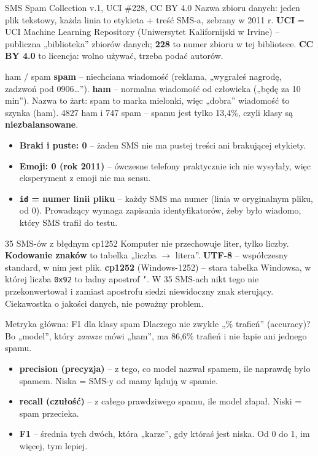 \documentclass[11pt,a4paper]{article}
\begin{document}
\begin{pojecie}{SMS Spam Collection v.1, UCI \#228, CC BY 4.0}
Nazwa zbioru danych: jeden plik tekstowy, każda linia to etykieta + treść SMS-a, zebrany w 2011 r.
\textbf{UCI} = UCI Machine Learning Repository (Uniwersytet Kalifornijski w Irvine) -- publiczna „biblioteka” zbiorów
danych; \textbf{228} to numer zbioru w tej bibliotece. \textbf{CC BY 4.0} to licencja: wolno używać, trzeba podać autorów.
\end{pojecie}

\begin{pojecie}{ham / spam}
\textbf{spam} -- niechciana wiadomość (reklama, „wygrałeś nagrodę, zadzwoń pod 0906…”).
\textbf{ham} -- normalna wiadomość od człowieka („będę za 10 min”). Nazwa to żart: spam to marka mielonki,
więc „dobra” wiadomość to szynka (ham). 4827 ham i 747 spam -- spamu jest tylko 13,4\%, czyli klasy są
\textbf{niezbalansowane}.
\end{pojecie}

\begin{itemize}
  \item \textbf{Braki i puste: 0} -- żaden SMS nie ma pustej treści ani brakującej etykiety.
  \item \textbf{Emoji: 0 (rok 2011)} -- ówczesne telefony praktycznie ich nie wysyłały, więc eksperyment z emoji nie ma sensu.
  \item \textbf{\texttt{id} = numer linii pliku} -- każdy SMS ma numer (linia w oryginalnym pliku, od 0). Prowadzący wymaga
        zapisania identyfikatorów, żeby było wiadomo, który SMS trafił do testu.
\end{itemize}

\begin{pojecie}{35 SMS-ów z błędnym cp1252}
Komputer nie przechowuje liter, tylko liczby. \textbf{Kodowanie znaków} to tabelka „liczba $\to$ litera”.
\textbf{UTF-8} -- współczesny standard, w nim jest plik. \textbf{cp1252} (Windows-1252) -- stara tabelka Windowsa, w której
liczba \texttt{0x92} to ładny apostrof \texttt{’}. W 35 SMS-ach nikt tego nie przekonwertował i zamiast apostrofu siedzi
niewidoczny znak sterujący. Ciekawostka o jakości danych, nie poważny problem.
\end{pojecie}

\begin{pojecie}{Metryka główna: F1 dla klasy spam}
Dlaczego nie zwykłe „\% trafień” (accuracy)? Bo „model”, który \emph{zawsze} mówi „ham”, ma 86,6\% trafień i nie łapie
ani jednego spamu.
\begin{itemize}
  \item \textbf{precision (precyzja)} -- z tego, co model nazwał spamem, ile naprawdę było spamem. Niska = SMS-y od mamy lądują w spamie.
  \item \textbf{recall (czułość)} -- z całego prawdziwego spamu, ile model złapał. Niski = spam przecieka.
  \item \textbf{F1} -- średnia tych dwóch, która „karze”, gdy któraś jest niska. Od 0 do 1, im więcej, tym lepiej.
\end{itemize}
\end{pojecie}
\end{document}

